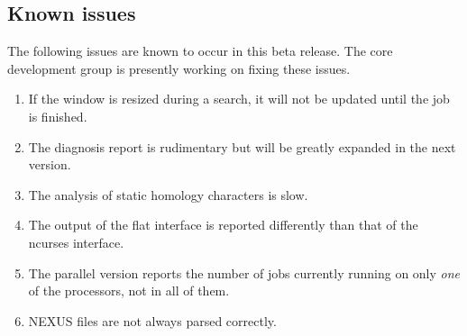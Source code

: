 \subsection{Known issues}{\label{sec:known_issues}}

The following issues are known to occur in this beta release. The
core \poy development group is presently working on fixing these
issues.

\begin{enumerate}
    \item If the window is resized during a search, it will not be updated until
        the job is finished.
    \item The diagnosis report is rudimentary but will be greatly expanded in the next version.
    \item The analysis of static homology characters is slow.
    \item The output of the flat interface is reported differently than that of the
        ncurses interface.
    \item The parallel version reports the number of jobs currently running on only 
        \emph{one} of the processors, not in all of them.
    \item NEXUS files are not always parsed correctly.
\end{enumerate}
